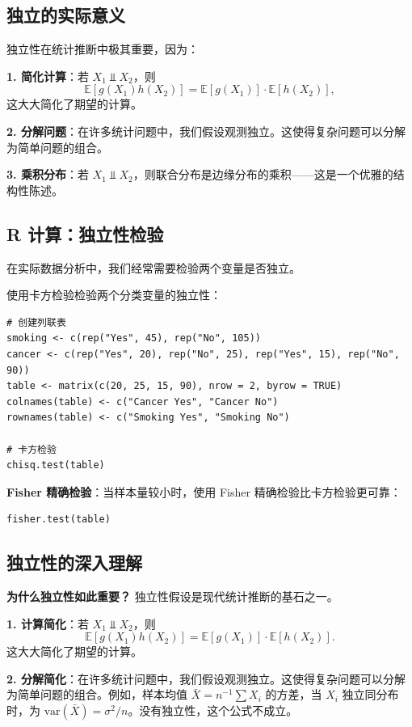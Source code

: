\subsection{独立的实际意义}

独立性在统计推断中极其重要，因为：

\textbf{1. 简化计算}：若 $X_1 \Perp X_2$，则
\[
\mathbb{E}[g(X_1)h(X_2)] = \mathbb{E}[g(X_1)] \cdot \mathbb{E}[h(X_2)],
\]
这大大简化了期望的计算。

\textbf{2. 分解问题}：在许多统计问题中，我们假设观测独立。这使得复杂问题可以分解为简单问题的组合。

\textbf{3. 乘积分布}：若 $X_1 \Perp X_2$，则联合分布是边缘分布的乘积——这是一个优雅的结构性陈述。

\subsection{R 计算：独立性检验}

在实际数据分析中，我们经常需要检验两个变量是否独立。

\begin{example}[独立性检验]\label{ex:independence-test-ch2}
使用卡方检验检验两个分类变量的独立性：
\begin{verbatim}
# 创建列联表
smoking <- c(rep("Yes", 45), rep("No", 105))
cancer <- c(rep("Yes", 20), rep("No", 25), rep("Yes", 15), rep("No", 90))
table <- matrix(c(20, 25, 15, 90), nrow = 2, byrow = TRUE)
colnames(table) <- c("Cancer Yes", "Cancer No")
rownames(table) <- c("Smoking Yes", "Smoking No")

# 卡方检验
chisq.test(table)
\end{verbatim}
\end{example}

\textbf{Fisher 精确检验}：当样本量较小时，使用 Fisher 精确检验比卡方检验更可靠：
\begin{verbatim}
fisher.test(table)
\end{verbatim}


\subsection{独立性的深入理解}

\textbf{为什么独立性如此重要？} 独立性假设是现代统计推断的基石之一。

\textbf{1. 计算简化}：若 $X_1 \Perp X_2$，则
\[
\mathbb{E}[g(X_1)h(X_2)] = \mathbb{E}[g(X_1)] \cdot \mathbb{E}[h(X_2)].
\]
这大大简化了期望的计算。

\textbf{2. 分解简化}：在许多统计问题中，我们假设观测独立。这使得复杂问题可以分解为简单问题的组合。例如，样本均值 $\bar{X} = n^{-1}\sum X_i$ 的方差，当 $X_i$ 独立同分布时，为 $\text{var}(\bar{X}) = \sigma^2/n$。没有独立性，这个公式不成立。

